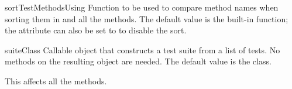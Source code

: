 \begin{memberdesc}[TestLoader]{sortTestMethodsUsing}
  Function to be used to compare method names when sorting them in
   and all the  methods.
  The default value is the built-in  function; the attribute
  can also be set to  to disable the sort.
\end{memberdesc}

\begin{memberdesc}[TestLoader]{suiteClass}
  Callable object that constructs a test suite from a list of tests.
  No methods on the resulting object are needed.  The default value is
  the  class.
  
  This affects all the  methods.
\end{memberdesc}
